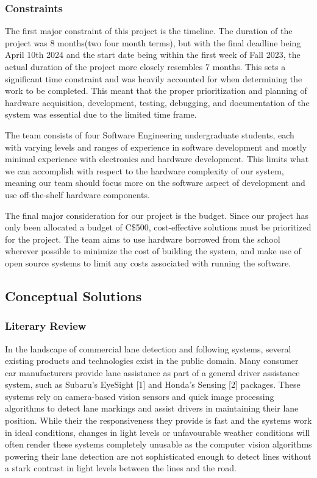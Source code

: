 \documentclass[titlepage]{article}
\begin{document}
\subsubsection{Constraints}

The first major constraint of this project is the timeline. The duration of the project was 8 months(two four month terms), but with the final deadline being April 10th 2024 and the start date being within the first week of Fall 2023, the actual duration of the project more closely resembles 7 months. This sets a significant time constraint and was heavily accounted for when determining the work to be completed. This meant that the proper prioritization and planning of hardware acquisition, development, testing, debugging, and documentation of the system was essential due to the limited time frame.

The team consists of four Software Engineering undergraduate students, each with varying levels and ranges of experience in software development and mostly minimal experience with electronics and hardware development. This limits what we can accomplish with respect to the hardware complexity of our system, meaning our team should focus more on the software aspect of development and use off-the-shelf hardware components.

The final major consideration for our project is the budget. Since our project has only been allocated a budget of C\$500, cost-effective solutions must be prioritized for the project. The team aims to use hardware borrowed from the school wherever possible to minimize the cost of building the system, and make use of open source systems to limit any costs associated with running the software.

\subsection{Conceptual Solutions}

\subsubsection{Literary Review}

In the landscape of commercial lane detection and following systems, several existing products and technologies exist in the public domain. Many consumer car manufacturers provide lane assistance as part of a general driver assistance system, such as Subaru’s EyeSight [1] and Honda’s Sensing [2] packages. These systems rely on camera-based vision sensors and quick image processing algorithms to detect lane markings and assist drivers in maintaining their lane position. While their the responsiveness they provide is fast and the systems work in ideal conditions, changes in light levels or unfavourable weather conditions will often render these systems completely unusable as the computer vision algorithms powering their lane detection are not sophisticated enough to detect lines without a stark contrast in light levels between the lines and the road.
\end{document}
